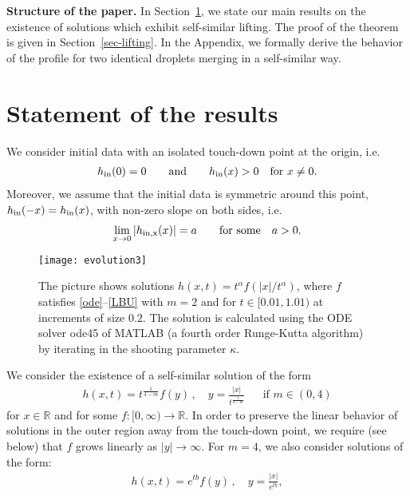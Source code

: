\documentclass{article}%
\newcommand{\alp}{\alpha}
\newcommand{\R}{\mathbb{R}}
\begin{document}
\medskip

\textbf{Structure of the paper.} In Section~\ref{sec-results}, we state our main
results on the existence of solutions which exhibit self-similar lifting. The
proof of the theorem is given in Section~\ref{sec-lifting}. In the Appendix, we
formally derive the behavior of the profile for two identical droplets merging
in a self-similar way.

\section{Statement of the results}\label{sec-results}
We consider initial data with an isolated touch-down point at the origin, i.e.
\begin{align}\label{separation-point}
  h_{\rm in}(0) = 0 \qquad \text{and} \qquad
  h_{\rm in}(x) > 0 \quad \mbox{for}\ x \neq 0.
\end{align}
Moreover, we assume that the initial data is symmetric around this point, $h_{\rm in}(-x) = h_{\rm in}(x)$, with
non-zero slope on both sides, i.e.
\begin{align}\label{separation-point-angle}
  \lim_{x\to 0} |h_{\rm in,x}(x)| = a \quad && \mbox{for some} \quad a>0.
\end{align}
\begin{figure}[hhh]
  \begin{center}
    \texttt{[image: evolution3]}
  \end{center}
  \caption{The picture shows solutions $h(x,t)=t^\alpha f(|x|/t^\alp)$, where
    $f$ satisfies \eqref{ode}--\eqref{LBU} with $m=2$ and for $t\in[0.01,1.01)$
    at increments of size $0.2$. The solution is calculated using the ODE
      solver ode45 of MATLAB (a fourth order Runge-Kutta algorithm) by iterating
      in the shooting parameter $\kappa$.}
\label{evolution}
\end{figure}
We consider the existence of a self-similar solution of the form
\begin{align}\label{ss-form}
  h(x,t) = t^{\frac{1}{4-m}} f(y)\,,\quad y=\frac{|x|}{t^{\frac{1}{4-m}}} && \mbox{if } m \in (0,4)
\end{align}
for $x \in \R$ and for some $f : [0,\infty) \to \R$. In order to preserve
  the linear behavior of solutions in the outer region away from the touch-down
  point, we require (see below) that $f$ grows linearly as $|y| \to \infty$. For
$m=4$, we also consider solutions of the form:
\begin{align}\label{ss-form4}
  h(x,t) = e^{tb} f(y)\,,\quad y=\frac{|x|}{e^{tb}},
  \end{align}
\end{document}
